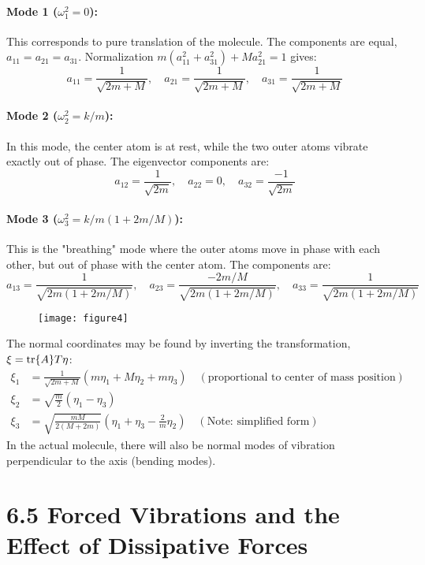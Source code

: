 \documentclass[12pt]{article}
\begin{document}
	\paragraph{Mode 1 ($\omega_1^2 = 0$):} This corresponds to pure translation of the molecule. The components are equal, $a_{11}=a_{21}=a_{31}$. Normalization $m(a_{11}^2 + a_{31}^2) + M a_{21}^2 = 1$ gives:
	\[
	a_{11} = \frac{1}{\sqrt{2m+M}}, \quad a_{21} = \frac{1}{\sqrt{2m+M}}, \quad a_{31} = \frac{1}{\sqrt{2m+M}}
	\]
	
	\paragraph{Mode 2 ($\omega_2^2 = k/m$):} In this mode, the center atom is at rest, while the two outer atoms vibrate exactly out of phase. The eigenvector components are:
	\[
	a_{12} = \frac{1}{\sqrt{2m}}, \quad a_{22} = 0, \quad a_{32} = \frac{-1}{\sqrt{2m}}
	\]
	
	\paragraph{Mode 3 ($\omega_3^2 = k/m(1+2m/M)$):} This is the "breathing" mode where the outer atoms move in phase with each other, but out of phase with the center atom. The components are:
	\[
	a_{13} = \frac{1}{\sqrt{2m(1+2m/M)}}, \quad a_{23} = \frac{-2m/M}{\sqrt{2m(1+2m/M)}}, \quad a_{33} = \frac{1}{\sqrt{2m(1+2m/M)}}
	\]
	
	\begin{figure}[h]
		\centering
		\texttt{[image: figure4]}
		\caption{}
		\label{fig:figure4}
	\end{figure}
	
	The normal coordinates may be found by inverting the transformation, $\xi = \tr{A} T \eta$:
	\begin{align*}
		\xi_1 &= \frac{1}{\sqrt{2m+M}} (m\eta_1 + M\eta_2 + m\eta_3) \quad (\text{proportional to center of mass position}) \\
		\xi_2 &= \sqrt{\frac{m}{2}} (\eta_1 - \eta_3) \\
		\xi_3 &= \sqrt{\frac{mM}{2(M+2m)}} \left( \eta_1 + \eta_3 - \frac{2}{m} \eta_2 \right) \quad (\text{Note: simplified form})
	\end{align*}
	In the actual molecule, there will also be normal modes of vibration perpendicular to the axis (bending modes).
	\section*{6.5 Forced Vibrations and the Effect of Dissipative Forces}
	
\end{document}
